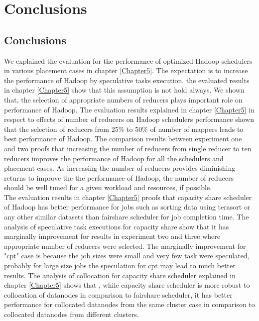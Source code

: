 
\chapter{Conclusions} %

\label{Chapter7} %



\section{Conclusions}
 
 
 We explained the evaluation for the performance of optimized Hadoop schedulers in various placement cases in chapter \ref{Chapter5}. The expectation is to increase the performance of Hadoop by speculative tasks execution, the evaluated results in chapter \ref{Chapter5} show that this assumption is not hold always. We shown that, the selection of appropriate numbers of reducers plays important role on performance of Hadoop. The evaluation results explained in chapter \ref{Chapter5} in respect to effects of number of reducers on Hadoop schedulers performance shown that the selection of reducers from 25\% to 50\% of number of mappers leads to best performance of Hadoop. The comparison results between experiment one and two proofs that increasing the number of reducers from single reducer to ten reducers improves the performance of Hadoop for all the schedulers and placement cases. As increasing the number of reducers provides diminishing returns to improve the the performance of Hadoop, the number of reducers should be well tuned for a given workload and resources, if possible.\\
 
 
 The evaluation results in chapter \ref{Chapter5} proofs that capacity share scheduler of Hadoop has better performance for jobs such as sorting data using terasort or any other similar datasets than fairshare scheduler for job completion time. The analysis of speculative task executions for capacity share show that it has marginally improvement for results in experiment two and three where appropriate number of reducers were selected. The marginally improvement for "cpt" case is because the job sizes were small and very few task were speculated, probably for large size jobs the speculation for cpt may lead to much better results. The analysis of collocation for capacity share scheduler explained in chapter \ref{Chapter5} shows that , while capacity share scheduler is more robust to collocation of datanodes in comparison to fairshare scheduler, it has better performance for collocated datanodes from the same cluster case in comparison to collocated datanodes from different clusters. \\      
 
